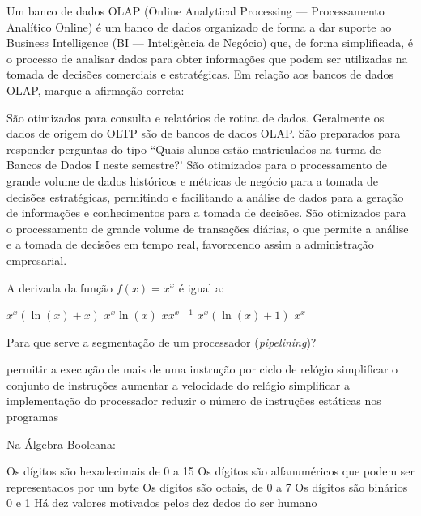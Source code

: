 \documentclass[12pt, addpoints]{exam}
\begin{document}
\begin{questions}
\question
Um banco de dados OLAP (Online Analytical Processing --- Processamento Analítico
Online) é um banco de dados organizado de forma a dar suporte ao Business
Intelligence (BI --- Inteligência de Negócio) que, de forma simplificada, é o
processo de analisar dados para obter informações que podem ser utilizadas na
tomada de decisões comerciais e estratégicas. Em relação aos bancos de dados
OLAP, marque a afirmação correta:
\begin{choices}
\choice São otimizados para consulta e relatórios de rotina de dados.
\choice Geralmente os dados de origem do OLTP são de bancos de dados OLAP.
\choice São preparados para responder perguntas do tipo ``Quais alunos estão matriculados na turma de Bancos de Dados I neste semestre?'
\choice São otimizados para o processamento de grande volume de dados históricos e métricas de negócio para a tomada de decisões estratégicas, permitindo e facilitando a análise de dados para a geração de informações e conhecimentos para a tomada de decisões.
\choice São otimizados para o processamento de grande volume de transações diárias, o que permite a análise e a tomada de decisões em tempo real, favorecendo assim a administração empresarial.
\end{choices}

\question
A derivada da função \( f(x) = x^x \) é igual a:
\begin{choices}
\choice \( x^x (\ln(x) + x) \)
\choice \( x^x \ln(x) \)
\choice \( x x^{x-1} \)
\choice \( x^x (\ln(x) + 1) \)
\choice \( x^x \)
\end{choices}

\question
Para que serve a segmentação de um processador (\textit{pipelining})?
\begin{choices}
\choice permitir a execução de mais de uma instrução por ciclo de relógio
\choice simplificar o conjunto de instruções
\choice aumentar a velocidade do relógio
\choice simplificar a implementação do processador
\choice reduzir o número de instruções estáticas nos programas
\end{choices}

\question
Na Álgebra Booleana:
\begin{choices}
\choice Os dígitos são hexadecimais de 0 a 15
\choice Os dígitos são alfanuméricos que podem ser representados por um byte
\choice Os dígitos são octais, de 0 a 7
\choice Os dígitos são binários 0 e 1
\choice Há dez valores motivados pelos dez dedos do ser humano
\end{choices}


\end{questions}
\end{document}
